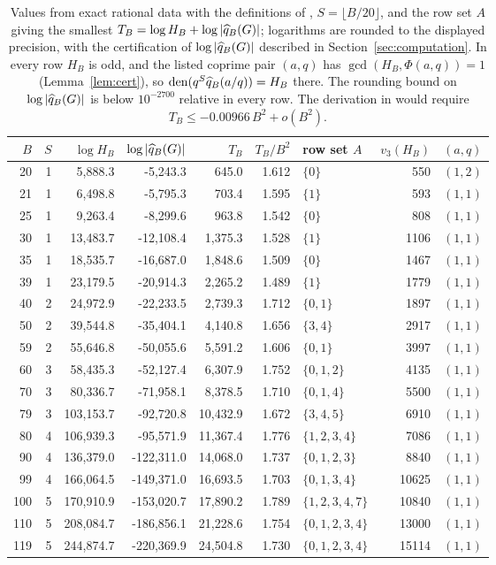 \begin{table}[ht]\centering\footnotesize
\caption{Values from exact rational data with the definitions of \cite{Sun26}, $S=\lfloor B/20\rfloor$, and the row set $A$ giving the smallest $T_B=\log H_B+\log|\widehat{q}_B(G)|$; logarithms are rounded to the displayed precision, with the certification of $\log|\widehat{q}_B(G)|$ described in Section~\ref{sec:computation}. In every row $H_B$ is odd, and the listed coprime pair $(a,q)$ has $\gcd(H_B,\Phi(a,q))=1$ (Lemma~\ref{lem:cert}), so $\operatorname{den}(q^S\widehat{q}_B(a/q))=H_B$ there. The rounding bound on $\log|\widehat{q}_B(G)|$ is below $10^{-2700}$ relative in every row. The derivation in \cite{Sun26} would require $T_B\le-0.00966\,B^2+o(B^2)$.}\label{tab:main}
\begin{tabular}{@{}rrrrrrlrl@{}}\toprule
$B$ & $S$ & $\log H_B$ & $\log|\widehat{q}_B(G)|$ & $T_B$ & $T_B/B^2$ & row set $A$ & $v_3(H_B)$ & $(a,q)$\\\midrule
20 & 1 & 5{,}888.3 & -5{,}243.3 & 645.0 & 1.612 & $\{0\}$ & 550 & $(1,2)$\\
21 & 1 & 6{,}498.8 & -5{,}795.3 & 703.4 & 1.595 & $\{1\}$ & 593 & $(1,1)$\\
25 & 1 & 9{,}263.4 & -8{,}299.6 & 963.8 & 1.542 & $\{0\}$ & 808 & $(1,1)$\\
30 & 1 & 13{,}483.7 & -12{,}108.4 & 1{,}375.3 & 1.528 & $\{1\}$ & 1106 & $(1,1)$\\
35 & 1 & 18{,}535.7 & -16{,}687.0 & 1{,}848.6 & 1.509 & $\{0\}$ & 1467 & $(1,1)$\\
39 & 1 & 23{,}179.5 & -20{,}914.3 & 2{,}265.2 & 1.489 & $\{1\}$ & 1779 & $(1,1)$\\
40 & 2 & 24{,}972.9 & -22{,}233.5 & 2{,}739.3 & 1.712 & $\{0,1\}$ & 1897 & $(1,1)$\\
50 & 2 & 39{,}544.8 & -35{,}404.1 & 4{,}140.8 & 1.656 & $\{3,4\}$ & 2917 & $(1,1)$\\
59 & 2 & 55{,}646.8 & -50{,}055.6 & 5{,}591.2 & 1.606 & $\{0,1\}$ & 3997 & $(1,1)$\\
60 & 3 & 58{,}435.3 & -52{,}127.4 & 6{,}307.9 & 1.752 & $\{0,1,2\}$ & 4135 & $(1,1)$\\
70 & 3 & 80{,}336.7 & -71{,}958.1 & 8{,}378.5 & 1.710 & $\{0,1,4\}$ & 5500 & $(1,1)$\\
79 & 3 & 103{,}153.7 & -92{,}720.8 & 10{,}432.9 & 1.672 & $\{3,4,5\}$ & 6910 & $(1,1)$\\
80 & 4 & 106{,}939.3 & -95{,}571.9 & 11{,}367.4 & 1.776 & $\{1,2,3,4\}$ & 7086 & $(1,1)$\\
90 & 4 & 136{,}379.0 & -122{,}311.0 & 14{,}068.0 & 1.737 & $\{0,1,2,3\}$ & 8840 & $(1,1)$\\
99 & 4 & 166{,}064.5 & -149{,}371.0 & 16{,}693.5 & 1.703 & $\{0,1,3,4\}$ & 10625 & $(1,1)$\\
100 & 5 & 170{,}910.9 & -153{,}020.7 & 17{,}890.2 & 1.789 & $\{1,2,3,4,7\}$ & 10840 & $(1,1)$\\
110 & 5 & 208{,}084.7 & -186{,}856.1 & 21{,}228.6 & 1.754 & $\{0,1,2,3,4\}$ & 13000 & $(1,1)$\\
119 & 5 & 244{,}874.7 & -220{,}369.9 & 24{,}504.8 & 1.730 & $\{0,1,2,3,4\}$ & 15114 & $(1,1)$\\
\bottomrule\end{tabular}\end{table}
